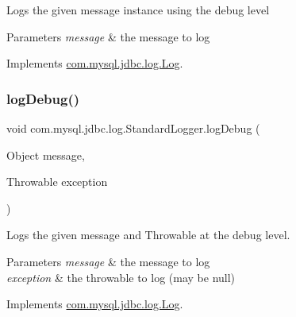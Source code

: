 Logs the given message instance using the \textquotesingle{}debug\textquotesingle{} level


\begin{DoxyParams}{Parameters}
{\em message} & the message to log \\
\hline
\end{DoxyParams}


Implements \mbox{\hyperlink{interfacecom_1_1mysql_1_1jdbc_1_1log_1_1_log_aa6f1e099156b6a444addba331704c2fe}{com.\+mysql.\+jdbc.\+log.\+Log}}.

\mbox{\label{classcom_1_1mysql_1_1jdbc_1_1log_1_1_standard_logger_a136dd58baec91623e40b0a7c8d1d1872}} 
\subsubsection{\texorpdfstring{log\+Debug()}{logDebug()}\hspace{0.1cm}{\footnotesize\ttfamily [2/2]}}
{\footnotesize\ttfamily void com.\+mysql.\+jdbc.\+log.\+Standard\+Logger.\+log\+Debug (\begin{DoxyParamCaption}\item[{Object}]{message,  }\item[{Throwable}]{exception }\end{DoxyParamCaption})}

Logs the given message and Throwable at the \textquotesingle{}debug\textquotesingle{} level.


\begin{DoxyParams}{Parameters}
{\em message} & the message to log \\
\hline
{\em exception} & the throwable to log (may be null) \\
\hline
\end{DoxyParams}


Implements \mbox{\hyperlink{interfacecom_1_1mysql_1_1jdbc_1_1log_1_1_log_ae11c12bcf67d9681ab03e97b9098d28d}{com.\+mysql.\+jdbc.\+log.\+Log}}.

\mbox{\label{classcom_1_1mysql_1_1jdbc_1_1log_1_1_standard_logger_a8028fd5f19c7fce7b4568fbbe357d857}} 
